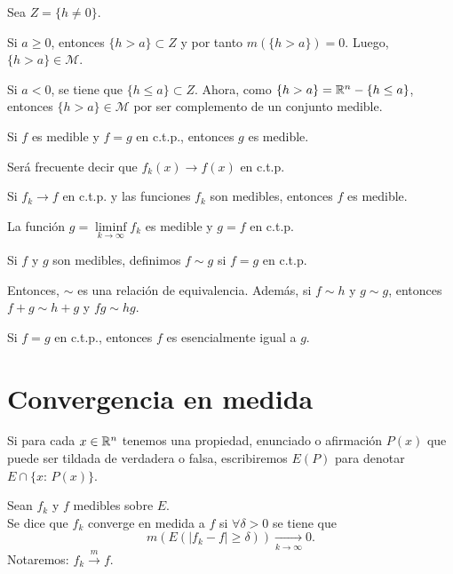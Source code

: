 \begin{demo}
Sea $Z=\{h \neq 0\}$. 

Si $a \geq 0$, entonces $\{h>a\}\subset Z$ y por tanto $m(\{h>a\})=0.$ Luego, $\{h>a\} \in \mathscr{M}$.

Si $a < 0$, se tiene que  $\{h\leq a\}\subset Z$. Ahora,  como $\{h>a\}=\mathbb{R}^n-\{h\leq a\}$, entonces  $\{h>a\} \in \mathscr{M}$ por ser complemento de un conjunto medible.
\end{demo}



\begin{corolario}{}
Si $f$ es medible y $f=g$ en c.t.p., entonces $g$ es medible. 
\end{corolario}


Ser\'a frecuente decir que $f_k(x) \to f(x)$ en c.t.p.

\begin{teorema}{}
Si $f_k \to f$ en c.t.p. y las funciones $f_k$ son medibles, entonces 
$f$ es medible.
\end{teorema}

\begin{demo}
La funci\'on $g=\liminf\limits_{k \to \infty} f_k$ es medible y $g=f$ en c.t.p.
\end{demo}

Si $f$ y $g$ son medibles, definimos $f \sim g$ si $f=g$ en c.t.p.

Entonces, $\sim$ es una relaci\'on de equivalencia. Adem\'as, si $f\sim h$ y $g \sim g$, entonces $f+g\sim h+g$ y $fg\sim hg$.

Si $f=g$ en c.t.p., entonces $f$ es esencialmente igual a $g$.

\section{Convergencia en medida}

Si para cada $x\in \mathbb{R}^n$ tenemos una propiedad, enunciado o afirmaci\'on $P(x)$ que puede ser tildada de  verdadera o falsa, escribiremos $E(P)$ para denotar $E\cap \{x:\,P(x)\}$.

\begin{definicion}{}
Sean $f_k$ y $f$  medibles sobre $E$.\\
Se dice que $f_k$ converge en medida a $f$ si $\forall \delta>0$ se tiene que 
\[
m(E(|f_k-f|\geq \delta))\xrightarrow[k \to \infty]{} 0.
\]
Notaremos: $f_k \xrightarrow[]{m} f$.
\end{definicion}


